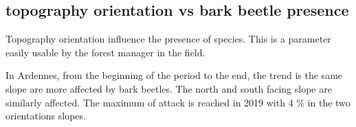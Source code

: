 \documentclass[3p,procedia]{elsarticle}
\begin{document}


	


\subsection{topography orientation vs bark beetle presence}

Topography orientation influence the presence of species. 
This is a parameter easily usable by the forest manager in the field.  

In Ardennes, from the beginning of the period to the end, the trend is the same slope are more affected by bark beetles. 
The north and south facing slope are similarly affected. 
The maximum of attack is reached in 2019 with 4 \% in the two orientations slopes.
\end{document}
